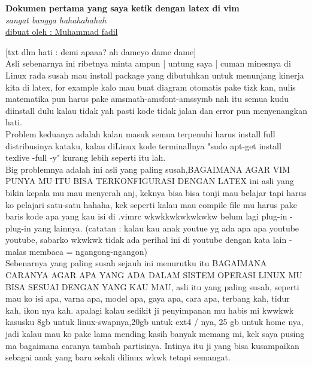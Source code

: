 \documentclass[12pt]{article}
\begin{document}
\begin{center}
	\textbf{Dokumen pertama yang saya ketik dengan latex di vim }\\
	\textit{sangat bangga hahahahahah}\\
\underline{dibuat oleh : Muhammad fadil }
\end{center}
[txt dlm hati : demi apaaa? ah dameyo dame dame]\\

Asli sebenarnya ini ribetnya minta ampun | untung saya |
cuman minesnya di Linux rada susah mau install package yang dibutuhkan untuk menunjang kinerja kita di latex, for example kalo mau buat diagram otomatis pake tizk kan, nulis matematika pun harus pake amsmath-amsfont-amssymb nah itu semua kudu diinstall dulu kalau tidak yah pasti kode tidak jalan dan error pun menyenangkan hati.\\

Problem keduanya adalah kalau masuk semua terpenuhi harus install full distribusinya kataku, kalau diLinux kode terminallnya "sudo apt-get install texlive -full -y" kurang lebih seperti itu lah. \\

Big problemnya adalah ini asli yang paling susah,BAGAIMANA AGAR VIM PUNYA MU ITU BISA TERKONFIGURASI DENGAN LATEX  ini asli yang bikin kepala mu mau menyerah anj, keknya bisa bisa tonji mau belajar tapi harus ko pelajari satu-satu hahaha, kek seperti kalau mau compile file mu harus pake baris kode apa yang kau isi di .vimrc wkwkkwkwkwkwkw belum lagi plug-in - plug-in yang lainnya. (catatan : kalau kau anak youtue yg ada apa apa youtube youtube, sabarko wkwkwk tidak ada perihal ini di youtube dengan kata lain - malas membaca = ngangong-ngangon) \\

Sebenarnya yang paling susah sejauh ini menurutku itu BAGAIMANA CARANYA AGAR APA YANG ADA DALAM SISTEM OPERASI LINUX MU BISA SESUAI DENGAN YANG KAU MAU, asli itu yang paling susah, seperti mau ko isi apa, varna apa, model apa, gaya apa, cara apa, terbang kah, tidur kah, ikon nya kah. apalagi kalau sedikit ji penyimpanan mu habis mi kwwkwk kasusku 8gb untuk linux-swapnya,20gb untuk ext4 / nya, 25 gb untuk home nya, jadi kalau mau ko pake lama mending kasih banyak memang mi, kek saya pusing ma bagaimana caranya tambah partisinya. Intinya itu ji yang bisa kusampaikan sebagai anak yang baru sekali dilinux wkwk tetapi semangat. 
\end{document}

